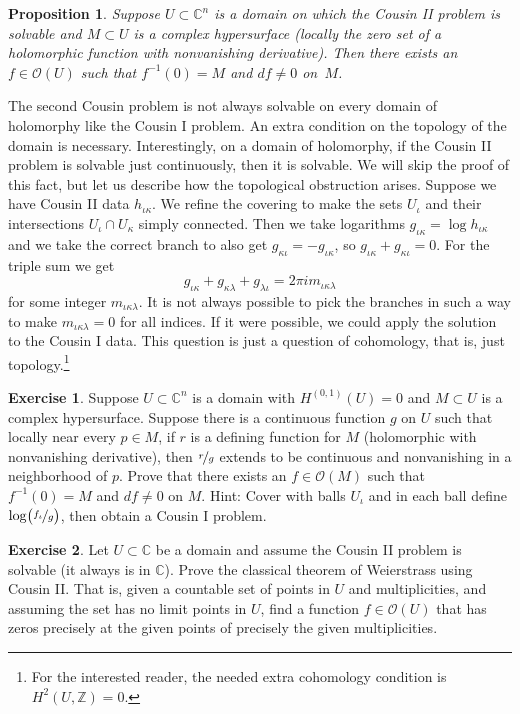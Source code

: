 \documentclass[12pt,openany]{book}
\newcommand{\C}{{\mathbb{C}}}
\newcommand{\Z}{{\mathbb{Z}}}
\newcommand{\sO}{{\mathscr{O}}}
\theoremstyle{plain}
\newtheorem{prop}[thm]{Proposition}
\theoremstyle{remark}
\theoremstyle{definition}
\newenvironment{exbox}{%
    \def\FrameCommand{\vrule width 1pt \relax\hspace{10pt}}%
    \MakeFramed{\advance\hsize-\width\FrameRestore}%
}{%
    \endMakeFramed
}
\theoremstyle{exercise}
\newtheorem{exercise}{Exercise}[section]
\theoremstyle{example}
\begin{document}
\begin{prop}
Suppose $U \subset \C^n$ is a domain on which the Cousin II problem is
solvable and $M \subset U$ is a complex hypersurface (locally the zero set
of a holomorphic function with nonvanishing derivative).
Then there exists an $f \in \sO(U)$ such that $f^{-1}(0) = M$ and
$df \not=0$ on~$M$.
\end{prop}

The second Cousin problem is not always solvable on every domain of
holomorphy like the Cousin I problem.  An extra condition on the topology of
the domain is necessary.  Interestingly, on a domain of holomorphy, if the
Cousin II problem is solvable just continuously, then it is solvable.
We will skip the proof of this fact, but let us describe how
the topological obstruction arises.
Suppose we have Cousin II data $h_{\iota\kappa}$.  We refine the
covering to make the sets $U_{\iota}$ and their intersections
$U_\iota\cap U_\kappa$ simply connected.  Then we take logarithms
$g_{\iota\kappa} = \log h_{\iota\kappa}$ and we take the correct
branch to also get $g_{\kappa\iota} = -g_{\iota\kappa}$, so
$g_{\iota\kappa}+g_{\kappa\iota} = 0$.  For the triple sum
we get
\begin{equation*}
g_{\iota\kappa}+g_{\kappa\lambda}+g_{\lambda\iota} = 2\pi i
m_{\iota\kappa\lambda}
\end{equation*}
for some integer $m_{\iota\kappa\lambda}$.
It is not always possible to pick the branches in
such a way to make $m_{\iota\kappa\lambda}=0$ for all indices.
If it were possible, we could apply the
solution to the Cousin I data.
This question is just a question of
cohomology, that is, just topology.\footnote{%
For the interested reader, the needed extra cohomology condition is $H^2(U,\Z)=0$.}

\begin{exbox}
\begin{exercise}
\pagebreak[2]
Suppose $U \subset \C^n$ is a domain with $H^{(0,1)}(U)=0$
and $M \subset U$ is a complex hypersurface.
Suppose there is a continuous function $g$ on $U$
such that locally near every $p \in M$, if $r$ is a defining function for $M$
(holomorphic with nonvanishing derivative),
then $\nicefrac{r}{g}$ extends to be continuous and nonvanishing in a
neighborhood of $p$.  Prove that there exists an $f \in \sO(M)$
such that $f^{-1}(0) = M$ and $df \not= 0$ on $M$.
Hint: Cover with balls $U_{\iota}$ and in each ball define
$\log\bigl(\nicefrac{f_\iota}{g}\bigr)$, then obtain a Cousin I problem.
\end{exercise}

\begin{exercise}
\pagebreak[2]
Let $U \subset \C$ be a domain and
assume the Cousin II problem is solvable (it always is in $\C$).
Prove the classical theorem of Weierstrass using Cousin II.  That is,
given a countable set of points in $U$ and multiplicities, and assuming the
set has no limit points in $U$, find a function $f \in \sO(U)$ that has
zeros precisely at the given points of precisely the given multiplicities.
\end{exercise}
\end{exbox}
\end{document}
